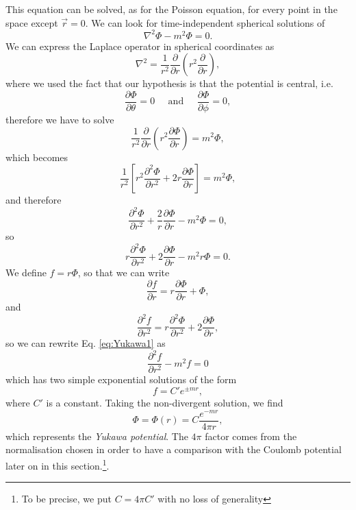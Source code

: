 This equation can be solved, as for the Poisson equation, for every point in the space except $\Vec{r} = 0$. We can look for time-independent spherical solutions of
\begin{equation*}
    \nabla^2\Phi - m^2\Phi = 0.
\end{equation*}
We can express the Laplace operator in spherical coordinates as
\begin{equation*}
    \nabla^2 = \frac{1}{r^2}\frac{\partial}{\partial r}\left( r^2\frac{\partial}{\partial r}\right),
\end{equation*}
where we used the fact that our hypothesis is that the potential is central, i.e.
\begin{equation*}
    \frac{\partial\Phi}{\partial\theta} = 0 \;\;\;\;\; \mbox{and} \;\;\;\;\; \frac{\partial\Phi}{\partial\phi} = 0,
\end{equation*}
therefore we have to solve
\begin{equation*}
    \frac{1}{r^2}\frac{\partial}{\partial r}\left(r^2\frac{\partial\Phi}{\partial r}\right) = m^2\Phi,
\end{equation*}
which becomes
\begin{equation*}
    \frac{1}{r^2}\left[r^2\frac{\partial^2\Phi}{\partial r^2} + 2r\frac{\partial\Phi}{\partial r}\right] = m^2\Phi,
\end{equation*}
and therefore
\begin{equation*}
    \frac{\partial^2\Phi}{\partial r^2} + \frac{2}{r}\frac{\partial\Phi}{\partial r} - m^2\Phi = 0,
\end{equation*}
so
\begin{equation}
    \label{eq:Yukawa1}
    r\frac{\partial^2\Phi}{\partial r^2} + 2\frac{\partial\Phi}{\partial r} - m^2r\Phi = 0.
\end{equation}
We define $f = r\Phi$, so that we can write
\begin{equation*}
    \frac{\partial f }{\partial r} = r\frac{\partial\Phi}{\partial r} + \Phi,
\end{equation*}
and
\begin{equation*}
    \frac{\partial^2f}{\partial r^2} = r\frac{\partial^2\Phi}{\partial r^2} + 2\frac{\partial\Phi}{\partial r},
\end{equation*}
so we can rewrite Eq. \eqref{eq:Yukawa1} as
\begin{equation*}
    \frac{\partial^2f}{\partial r^2} - m^2f = 0
\end{equation*}
which has two simple exponential solutions of the form
\begin{equation}
    f = C' e^{\pm mr},
\end{equation}
where $C'$ is a constant.
Taking the non-divergent solution, we find
\begin{equation}
    \label{eq:Yukawa-potential}
    \Phi = \Phi(r)= C \frac{e^{-mr}}{4\pi r},
\end{equation}
which represents the \emph{Yukawa potential}. The $4\pi$ factor comes from the normalisation chosen in order to have a comparison with the Coulomb potential later on in this section.\footnote{To be precise, we put $C=4\pi C'$ with no loss of generality}.

